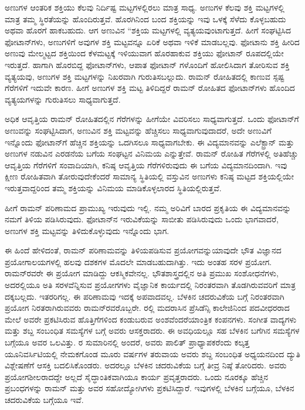 ಅಣುಗಳ ಆಂತರಿಕ ಶಕ್ತಿಯು ಕೆಲವು ನಿರ್ದಿಷ್ಟ ಮಟ್ಟಗಳಲ್ಲಿರಲು ಮಾತ್ರ ಸಾಧ್ಯ. ಅಣುಗಳ ಕೆಲವು ಶಕ್ತಿ ಮಟ್ಟಗಳಲ್ಲಿ ಮಾತ್ರ ತಮ್ಮ ಸ್ಥಿರತೆಯನ್ನು ಹೊಂದಿರುತ್ತವೆ. ಹೊರಗಿನಿಂದ ಬಂದ ಶಕ್ತಿಯನ್ನು ಇವು ಒಳಕ್ಕೆ ಸೆಳೆದು ಕೊಳ್ಳಬಹುದು ಅಥವಾ ಹೊರಗೆ ಹಾಕಬಹುದು. ಆಗ ಅಣುವಿನ “ಶಕ್ತಿಯ ಮಟ್ಟಗಳಲ್ಲಿ ವ್ಯತ್ಯಯವುಂಟಾಗುತ್ತದೆ. ಹೀಗೆ ಸಂಘಟ್ಟಿಸಿದ ಫೋಟಾನ್‍ಗಳು, ಅಣುಗಳಿಗೆ ಅವುಗಳ ಶಕ್ತಿ ಮಟ್ಟವನ್ನೂ ಏರಿಕೆ ಅಥವಾ ಇಳಿಕೆ ಮಾಡಬಲ್ಲವು. ಫೋಟಾನು ಶಕ್ತಿ ಹೀರಿದ ಅಣುವು ಮೇಲ್ಮಟ್ಟದ ಶಕ್ತಿಯಿಂದ ಕೆಳಮಟ್ಟಕ್ಕೆ ಇಳಿಯುವಾಗ ಹೊರಹಾಕುವ ಶಕ್ತಿಯು ಫೋಟಾನ್ ರೂಪದಲ್ಲಿಯೇ ಇರುತ್ತದೆ. ಹಾಗಾಗಿ ಹೊರಬಿದ್ದ ಫೋಟಾನ್‍ಗಳು, ಆಪಾತ ಫೋಟಾನ್ ಗಳೊಂದಿಗೆ ಹೋಲಿಸಿದಾಗ ತೋರಿಸುವ ಶಕ್ತಿ ವ್ಯತ್ಯಯವು, ಅಣುಗಳ ಶಕ್ತಿ ಮಟ್ಟಗಳನ್ನು ನಿಖರವಾಗಿ ಗುರುತಿಸಬಲ್ಲುದು. ರಾಮನ್ ರೋಹಿತದಲ್ಲಿ\break {} ಕಾಣುವ ಸ್ಪಷ್ಟ ಗೆರೆಗಳಿಗೆ ಇದುವೇ ಕಾರಣ. ಹೀಗೆ ಅಣುಗಳ ಶಕ್ತಿ ಮಟ್ಟ ತಿಳಿದಿದ್ದರೆ ರಾಮನ್ ರೋಹಿತದ ಫೋಟಾನ್‍ಗಳು ಹೊಂದಿದ ವ್ಯತ್ಯಯಗಳನ್ನು ಗುರುತಿಸಲು ಸಾಧ್ಯವಾಗುತ್ತದೆ.

ಅಧಿಕ ಆವೃತ್ತಿಯ ರಾಮನ್ ರೋಹಿತದಲ್ಲಿನ  ಗೆರೆಗಳನ್ನು ಹೀಗೆಯೇ ವಿವರಿಸಲು ಸಾಧ್ಯವಾಗುತ್ತದೆ. ಒಂದು ಫೋಟಾನ್‍ಗೆ ಅಣುವನ್ನು ಸಂಘಟ್ಟಿಸಿದಾಗ, ಅಣುವಿನ ಶಕ್ತಿ ಮಟ್ಟವನ್ನು ಹೆಚ್ಚಿಸಲು ಸಾಧ್ಯವಾಗುವುದಾದರೆ, ಅದೇ ಅಣುವಿಗೆ ಇನ್ನೊಂದು ಫೋಟಾನ್‍ಗೆ ಹೆಚ್ಚಿನ ಶಕ್ತಿಯನ್ನು ಒದಗಿಸಲೂ ಸಾಧ್ಯವಾಗಬೇಕು. ಈ ವಿದ್ಯಮಾನವನ್ನು ಎಲೆಕ್ಟ್ರಾನ್ ಮತ್ತು ಅಣುಗಳ ನಡುವಿನ ಎರಡನೆಯ ಬಗೆಯ ಸಂಘಟ್ಟನ ವಿನಿಮಯ ಎನ್ನುತ್ತೇವೆ. ರಾಮನ್ ರೋಹಿತ ಗೆರೆಗಳಲ್ಲಿ ಅತಿಹೆಚ್ಚು ಆವೃತ್ತಿಯ ಗೆರೆಗಳಿಗೆ ಸಂವಾದಿಯಾಗಿ, ಕನಿಷ್ಠ ಆವೃತ್ತಿಯ ಗೆರೆಗಳಿರುವುದು ಈ ಬಗೆಯ ವಿದ್ಯಮಾನದಿಂದಾಗಿ. ಇವು ಕ್ಷೀಣ ರೋಹಿತವಾಗಿ ತೋರುವುದೇಕೆಂದರೆ ಸಾಮಾನ್ಯ ಸ್ಥಿತಿಯಲ್ಲಿ ವಸ್ತುವಿನ ಅಣುಗಳು ಕನಿಷ್ಠ ಮಟ್ಟದ ಶಕ್ತಿಯಲ್ಲಿಯೇ ಇರುತ್ತವಾದ್ದರಿಂದ ತಮ್ಮ ಶಕ್ತಿಯನ್ನು ವಿನಿಮಯ ಮಾಡಿಕೊಳ್ಳಲಾರದ ಸ್ಥಿತಿಯಲ್ಲಿರುತ್ತವೆ.

ಹೀಗೆ ರಾಮನ್ ಪರಿಣಾಮದ ಪ್ರಾಮುಖ್ಯ ಇರುವುದು ಇಲ್ಲಿ. ನಮ್ಮ ಅರಿವಿಗೆ ಬಾರದ ಪ್ರಕೃತಿಯ ಈ ವಿದ್ಯಮಾನವನ್ನು ನಮಗೆ ತಿಳಿಯ ಪಡಿಸಿರುವುದು. ಫೋಟಾನ್‍ನ ಇರುವಿಕೆಯನ್ನು ಸಾಬೀತು ಪಡಿಸಿರುವುದು ಒಂದು ಭಾಗವಾದರೆ, ಅಣುಗಳ ಶಕ್ತಿ ಮಟ್ಟವನ್ನು ತಿಳಿದುಕೊಳ್ಳುವುದು ಇನ್ನೊಂದು ಭಾಗ.

ಈ ಹಿಂದೆ ಹೇಳಿದಂತೆ, ರಾಮನ್ ಪರಿಣಾಮವನ್ನು ತಿಳಿಯಪಡಿಸುವ ಪ್ರಯೋಗವನ್ನು\break ಯಾವುದೇ ಭೌತ ವಿಜ್ಞಾನದ ಪ್ರಯೋಗಾಲಯಗಳಲ್ಲಿ ಹಲವು ದಶಕಗಳ ಮೊದಲೇ ಮಾಡಬಹು\-ದಾಗಿತ್ತು. ಇದು ಅಂತಹ ಸರಳ ಪ್ರಯೋಗ. ರಾಮನ್‍ರವರೇ ಈ ಪ್ರಯೋಗ ಮಾಡಿದ್ದು ಆಕಸ್ಮಿಕವೇನಲ್ಲ. ಭೌತಶಾಸ್ತ್ರದಲ್ಲಿನ ಅತಿ ಪ್ರಮುಖ ಸಂಶೋಧನೆಗಳು, ಅದರಲ್ಲಿಯೂ ಅತಿ ಸರಳವೆನ್ನಿಸುವ ಪ್ರಯೋಗಗಳು ವೈಜ್ಞಾನಿಕ ಕಾರ್ಯದಲ್ಲಿ ನಿರಂತರವಾಗಿ ತೊಡಗಿರುವವರಿಗೆ ಮಾತ್ರ ದಕ್ಕಬಲ್ಲದು. ಇತರರಿಗಲ್ಲ. ಈ ಪರಿಣಾಮವು ಇದಕ್ಕೆ ಅಪವಾದವಲ್ಲ. ಬೆಳಕಿನ ಚದರುವಿಕೆಯ ಬಗ್ಗೆ ನಿರಂತರವಾಗಿ ಪ್ರಯೋಗ ನಿರತರಾಗಿರುವವರು ರಾಮನ್‍ರವರೊಬ್ಬರೇ. ರಲ್ಲಿ ಮದರಾಸಿನ ಪ್ರೆಸಿಡೆನ್ಸಿ ಕಾಲೇಜಿನಿಂದ ಪದವೀಧರರಾದ ಮೇಲೆ ಅವರೇ ಪ್ರಕಟಿಸಿರುವ ಹೊತ್ತಿಗೆಗಳಿಂದ\enginline{-} ಕಂಡು\-ಬರುವ ಅಂಶವೆಂದರೆ\enginline{-}ಯಾಂತ್ರಿಕ ಕಂಪನಗಳು. ಸಂಗೀತ ವಾದ್ಯಗಳು ಮತ್ತು ಶಬ್ದ ಸಂಬಂಧಿತ ಸಮಸ್ಯೆಗಳ ಬಗ್ಗೆ ಅವರು ಆಸಕ್ತರಾದರು. ಈ ಅವಧಿಯಲ್ಲೂ ಸಹ ಬೆಳಕಿನ ಬಗೆಗಿನ ಸಮಸ್ಯೆಗಳ ಬಗ್ಗೆಯೂ ಅವರ ಒಲವಿತ್ತು. ರ ಸುಮಾರಿನಲ್ಲಿ ಅಂದರೆ, ಅವರು ಪಾಲಿತ್ ಪ್ರಾಧ್ಯಾಪಕರೆಂದು ಕಲ್ಕತ್ತ ಯೂನಿವರ್ಸಿಟಿಯಲ್ಲಿ ನೇಮಕಗೊಂಡ ಮೂರು ವರ್ಷಗಳ ತರುವಾಯ ಅವರು ಶಬ್ದ ಸಂಬಂಧಿತ ಅಧ್ಯಯನದಿಂದ ದ್ಯುತಿ ವಿಶ್ಲೇಷಣೆಗೆ ಆಸಕ್ತಿ ಬದಲಿಸಿಕೊಂಡರು. ಅದರಲ್ಲೂ ಬೆಳಕಿನ ಚದರುವಿಕೆಯ ಬಗ್ಗೆ ತೀವ್ರ ನಿಷ್ಠೆ ತೋರಿದರು. ಅವರು ಪ್ರಯೋಗಶೀಲರಾದದ್ದೇ ಅಲ್ಲದೆ ಸೈದ್ಧಾಂತಿಕವಾಗಿಯೂ ಕಾರ್ಯ ಪ್ರವೃತ್ತರಾದರು. ಒಂದು ನೂರಕ್ಕೂ ಹೆಚ್ಚಿನ ಪ್ರಬಂಧಗಳನ್ನು ರಾಮನ್ ಮತ್ತು ಅವರ ಸಹೋದ್ಯೋಗಿಗಳು ಪ್ರಕಟಿಸಿದ್ದಾರೆ. ಇವುಗಳಲ್ಲಿ  ಬೆಳಕಿನ ಬಗ್ಗೆಯೂ,  ಬೆಳಕಿನ ಚದರುವಿಕೆಯ ಬಗ್ಗೆಯೂ ಇವೆ.

